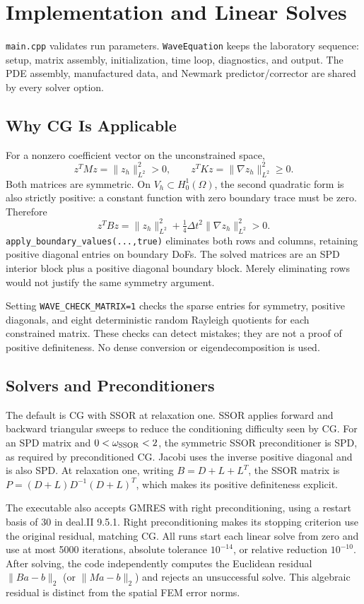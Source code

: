 \chapter{Implementation and Linear Solves}

\texttt{main.cpp} validates run parameters. \texttt{WaveEquation} keeps the
laboratory sequence: setup, matrix assembly, initialization, time loop,
diagnostics, and output. The PDE assembly, manufactured data, and Newmark
predictor/corrector are shared by every solver option.

\section{Why CG Is Applicable}
For a nonzero coefficient vector on the unconstrained space,
\[
 z^TMz=\|z_h\|_{L^2}^2>0,\qquad
 z^TKz=\|\nabla z_h\|_{L^2}^2\geq0.
\]
Both matrices are symmetric. On \(V_h\subset H^1_0(\Omega)\), the second
quadratic form is also strictly positive: a constant function with zero
boundary trace must be zero. Therefore
\[
 z^TBz=\|z_h\|_{L^2}^2+\tfrac14\Delta t^2\|\nabla z_h\|_{L^2}^2>0.
\]
\texttt{apply\_boundary\_values(...,true)} eliminates both rows and columns,
retaining positive diagonal entries on boundary DoFs. The solved matrices are
an SPD interior block plus a positive diagonal boundary block. Merely
eliminating rows would not justify the same symmetry argument.

Setting \texttt{WAVE\_CHECK\_MATRIX=1} checks the sparse entries for symmetry,
positive diagonals, and eight deterministic random Rayleigh quotients for
each constrained matrix. These checks can detect mistakes; they are not a
proof of positive definiteness. No dense conversion or eigendecomposition
is used.

\section{Solvers and Preconditioners}
The default is CG with SSOR at relaxation one. SSOR applies forward and
backward triangular sweeps to reduce the conditioning difficulty seen by CG.
For an SPD matrix and \(0<\omega_{\rm SSOR}<2\), the symmetric SSOR
preconditioner is SPD, as required by preconditioned CG.
Jacobi uses the inverse positive diagonal and is also SPD.
At relaxation one, writing \(B=D+L+L^T\), the SSOR matrix is
\(P=(D+L)D^{-1}(D+L)^T\), which makes its positive definiteness explicit.

The executable also accepts GMRES with right preconditioning, using a restart
basis of 30 in deal.II 9.5.1. Right preconditioning makes its stopping
criterion use the original residual, matching CG. All runs start each
linear solve from zero and use at most 5000 iterations, absolute tolerance
\(10^{-14}\), or relative reduction \(10^{-10}\).
After solving, the code independently computes the Euclidean residual
\(\|Ba-b\|_2\) (or \(\|Ma-b\|_2\)) and rejects an unsuccessful solve.
This algebraic residual is distinct from the spatial FEM error norms.

